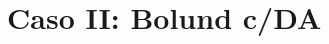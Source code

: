 





























\newpage
\section{Caso II: Bolund c/DA}
\begin{figure}[H]
	\begin{minipage}{0.5\linewidth}
	\end{minipage}%
	\begin{minipage}{0.5\linewidth}
	\end{minipage}%
	

\end{figure}
